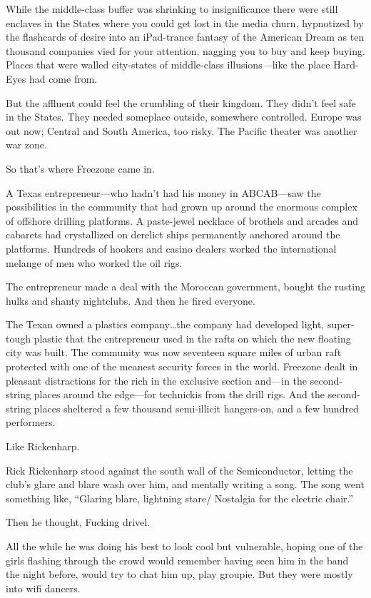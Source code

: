 While the middle-class buffer was shrinking to insignificance there were still enclaves in the States where you could get lost in the media churn, hypnotized by the flashcards of desire into an iPad-trance fantasy of the American Dream as ten thousand companies vied for your attention, nagging you to buy and keep buying. Places that were walled city-states of middle-class illusions---like the place Hard-Eyes had come from.

But the affluent could feel the crumbling of their kingdom. They didn't feel safe in the States. They needed someplace outside, somewhere controlled. Europe was out now; Central and South America, too risky. The Pacific theater was another war zone.

So that's where Freezone came in.

A Texas entrepreneur---who hadn't had his money in ABCAB---saw the possibilities in the community that had grown up around the enormous complex of offshore drilling platforms. A paste-jewel necklace of brothels and arcades and cabarets had crystallized on derelict ships permanently anchored around the platforms. Hundreds of hookers and casino dealers worked the international melange of men who worked the oil rigs.

The entrepreneur made a deal with the Moroccan government, bought the rusting hulks and shanty nightclubs. And then he fired everyone.

The Texan owned a plastics company\ldots the company had developed light, super-tough plastic that the entrepreneur used in the rafts on which the new floating city was built. The community was now seventeen square miles of urban raft protected with one of the meanest security forces in the world. Freezone dealt in pleasant distractions for the rich in the exclusive section and---in the second-string places around the edge---for technickis from the drill rigs. And the second-string places sheltered a few thousand semi-illicit hangers-on, and a few hundred performers.

Like Rickenharp.

Rick Rickenharp stood against the south wall of the Semiconductor, letting the club's glare and blare wash over him, and mentally writing a song. The song went something like, ``Glaring blare, lightning stare/ Nostalgia for the electric chair.''

Then he thought, Fucking drivel.

All the while he was doing his best to look cool but vulnerable, hoping one of the girls flashing through the crowd would remember having seen him in the band the night before, would try to chat him up, play groupie. But they were mostly into wifi dancers.

